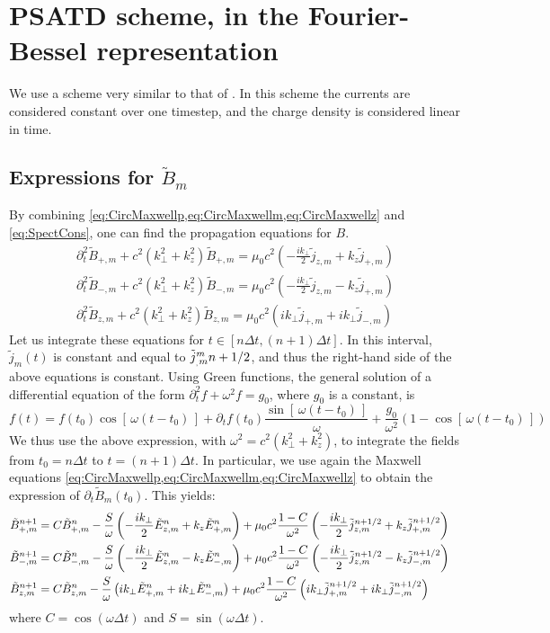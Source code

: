 \section{PSATD scheme, in the Fourier-Bessel
  representation}
\label{sec:PSTADderiv}

We use a scheme very similar to that of \cite{Haber}. In this scheme the currents are considered constant over one timestep, and the charge density is considered linear in time.

\subsection{Expressions for $\tilde{B}_m$}

By combining \cref{eq:CircMaxwellp,eq:CircMaxwellm,eq:CircMaxwellz}
and \cref{eq:SpectCons}, one can find the propagation equations for $B$.
\begin{align*}
\partial_t^2 \tilde{B}_{+,m} + c^2(k_\perp ^2+k_z^2) \tilde{B}_{+,m} = 
\mu_0 c^2 \left( - \frac{ik_\perp }{2} \tilde{j}_{z,m} + k_z \tilde{j}_{+,m}
\right) \\
\partial_t^2 \tilde{B}_{-,m} + c^2(k_\perp ^2+k_z^2) \tilde{B}_{-,m} = 
\mu_0 c^2 \left( - \frac{ik_\perp }{2} \tilde{j}_{z,m} - k_z \tilde{j}_{+,m}
\right) \\
\partial_t^2 \tilde{B}_{z,m} + c^2(k_\perp ^2+k_z^2) \tilde{B}_{z,m} =
\mu_0c^2  (ik_\perp  \tilde{j}_{+,m} + ik_\perp \tilde{j}_{-,m} ) 
\end{align*}
Let us integrate these equations for $t\in [n\Delta t, (n+1)\Delta
t]$. In this interval, $\tilde{j}_m(t)$ is constant
and equal to $\tilde{j}_{_,m}^{m}{n+1/2}$, and thus the right-hand side of the above
equations is constant. Using Green functions, the
general solution of a differential equation of the form 
$\partial_t^2 f + \omega^2 f = g_0$, where $g_0$ is a constant, is 
\[ f(t) = f(t_0) \cos[\,\omega (t-t_0)\,] + \partial_t f (t_0) \frac{
  \sin[\,\omega (t-t_0)\,]  }{\omega} + \frac{g_0}{\omega^2} (1-
\cos[\,\omega (t-t_0)\,] ) \]  
We thus use the above expression, with $\omega^2 =c^2(k_\perp^2 +
k_z^2)$, to integrate the fields from $t_0 = n\Delta t$ to $t=(n+1)\Delta t$. In
particular, we use again the Maxwell equations
\cref{eq:CircMaxwellp,eq:CircMaxwellm,eq:CircMaxwellz} to obtain the
expression of $\partial_t \tilde{B}_{m} (t_0)$. This yields:
\begin{align*}
\tilde{B}_{+,m}^{n+1} = \; & C \tilde{B}_{+,m}^{n} - 
\frac{S}{\omega}\left(-\frac{ik_\perp }{2} \tilde{E}_{z,m}^{n} + k_z\tilde{E}_{+,m}^{n}
\right) + \mu_0 c^2\frac{1-C}{\omega^2} \left( -\frac{ik_\perp }{2}
  \tilde{j}_{z,m}^{n+1/2} + k_z \tilde{j}_{+,m}^{n+1/2} \right)& \\
\tilde{B}_{-,m}^{n+1} =\; & C \tilde{B}_{-,m}^{n} - 
\frac{S}{\omega}\left(- \frac{ik_\perp }{2} \tilde{E}_{z,m}^{n} - k_z\tilde{E}_{-,m}^{n}
\right) + \mu_0 c^2\frac{1-C}{\omega^2} \left( - \frac{ik_\perp }{2}
  \tilde{j}_{z,m}^{n+1/2} - k_z \tilde{j}_{-,m}^{n+1/2} \right) &\\
\tilde{B}_{z,m}^{n+1} =\; & C \tilde{B}_{z,m}^{n} - 
\frac{S}{\omega}\left(ik_\perp \tilde{E}_{+,m}^{n} + ik_\perp \tilde{E}_{-,m}^{n}
\right) + \mu_0 c^2\frac{1-C}{\omega^2} \left( ik_\perp
  \tilde{j}_{+,m}^{n+1/2} + ik_\perp \tilde{j}_{-,m}^{n+1/2} \right)&
\end{align*}
where $C = \cos(\omega \Delta t)$ and $S = \sin(\omega \Delta t) $.


